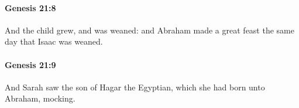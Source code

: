 		\paragraph{Genesis 21:8} %
			\label{GENESIS-21-8}

			And the child grew, and was weaned: and Abraham made a great feast the same day that Isaac was weaned.


		\paragraph{Genesis 21:9} %
			\label{GENESIS-21-9}

			And Sarah saw the son of Hagar the Egyptian, which she had born unto Abraham, mocking.


